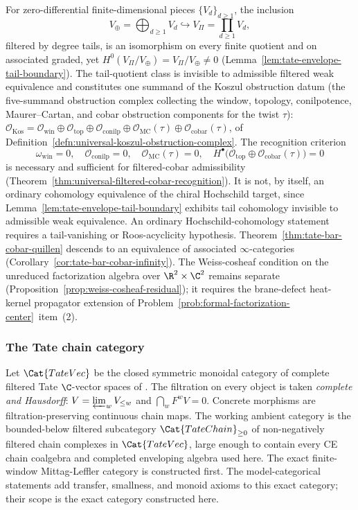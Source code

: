 For zero-differential finite-dimensional pieces $\{V_d\}_{d\geq1}$,
the inclusion
\[
  V_\oplus=\bigoplus_{d\geq1}V_d
    \hookrightarrow
  V_\Pi=\prod_{d\geq1}V_d,
\]
filtered by degree tails, is an isomorphism on every finite quotient
and on associated graded, yet $H^0(V_\Pi/V_\oplus)=V_\Pi/V_\oplus\neq0$
(Lemma~\ref{lem:tate-envelope-tail-boundary}).  The tail-quotient class
is invisible to admissible filtered weak equivalence and constitutes
one summand of the Koszul obstruction datum (the five-summand
obstruction complex collecting the window, topology, conilpotence,
Maurer--Cartan, and cobar obstruction components for the twist \(\tau\)):
$\mathcal O_{\mathrm{Kos}}=\mathcal O_{\mathrm{win}}\oplus
\mathcal O_{\mathrm{top}}\oplus\mathcal O_{\mathrm{conilp}}\oplus
\mathcal O_{\mathrm{MC}}(\tau)\oplus\mathcal O_{\mathrm{cobar}}(\tau)$,
of Definition~\ref{defn:universal-koszul-obstruction-complex}.  The
recognition criterion
\[
  \omega_{\mathrm{win}}=0,\quad
  \mathcal O_{\mathrm{conilp}}=0,\quad
  \mathcal O_{\mathrm{MC}}(\tau)=0,\quad
  H^\bullet\bigl(\mathcal O_{\mathrm{top}}
    \oplus\mathcal O_{\mathrm{cobar}}(\tau)\bigr)=0
\]
is necessary and sufficient for filtered-cobar admissibility
(Theorem~\ref{thm:universal-filtered-cobar-recognition}).  It is not,
by itself, an ordinary cohomology equivalence of the chiral Hochschild
target, since Lemma~\ref{lem:tate-envelope-tail-boundary} exhibits
tail cohomology invisible to admissible weak equivalence.  An ordinary
Hochschild-cohomology statement requires a tail-vanishing or
Roos-acyclicity hypothesis.
Theorem~\ref{thm:tate-bar-cobar-quillen} descends to an equivalence of
associated \(\infty\)-categories
(Corollary~\ref{cor:tate-bar-cobar-infinity}).  The Weiss-cosheaf
condition on the unreduced factorization algebra over $\R^2\times\C^2$
remains separate (Proposition~\ref{prop:weiss-cosheaf-residual}); it
requires the brane-defect heat-kernel propagator extension of
Problem~\ref{prob:formal-factorization-center}~item~(2).

\subsubsection{The Tate chain category}

Let $\Cat{TateVec}$ be the closed symmetric monoidal category of
complete filtered Tate $\C$-vector spaces of \alpharef. The
filtration on every object is taken \emph{complete and Hausdorff}:
$V=\varprojlim_w V_{\leq w}$ and $\bigcap_w F^w V=0$. Concrete
morphisms are filtration-preserving continuous chain maps. The
working ambient category is the bounded-below filtered subcategory
$\Cat{TateChain}_{\geq 0}$ of non-negatively filtered chain
complexes in $\Cat{TateVec}$, large enough to contain every CE chain
coalgebra and completed enveloping algebra used here.  The exact
finite-window Mittag-Leffler category is constructed first.  The
model-categorical statements add transfer, smallness, and monoid
axioms to this exact category; their scope is the exact category
constructed here.

